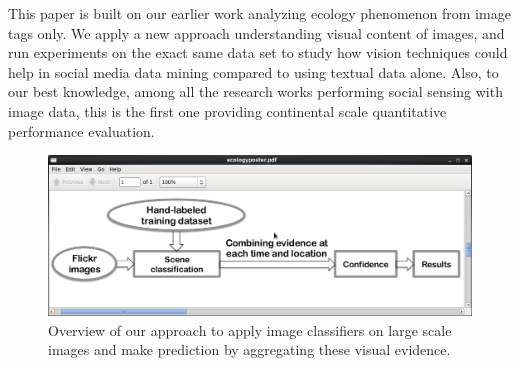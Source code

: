 \documentclass[10pt]{article}
\begin{document}
This paper is built on our earlier work  analyzing ecology phenomenon from image tags only. We apply a new approach understanding visual content of images, and run experiments on the exact same data set to study how vision techniques could help in social media data mining compared to using textual data alone. Also, to our best knowledge, among all the research works performing social sensing with image data, this is the first one providing continental scale quantitative performance evaluation.


\begin{figure}[h]
\includegraphics[scale=.3]{figure/overview.png}
\caption{Overview of our approach to apply image classifiers on large scale images and make prediction by aggregating these visual evidence. }
\label{fig:overview}
\end{figure}
\end{document}
